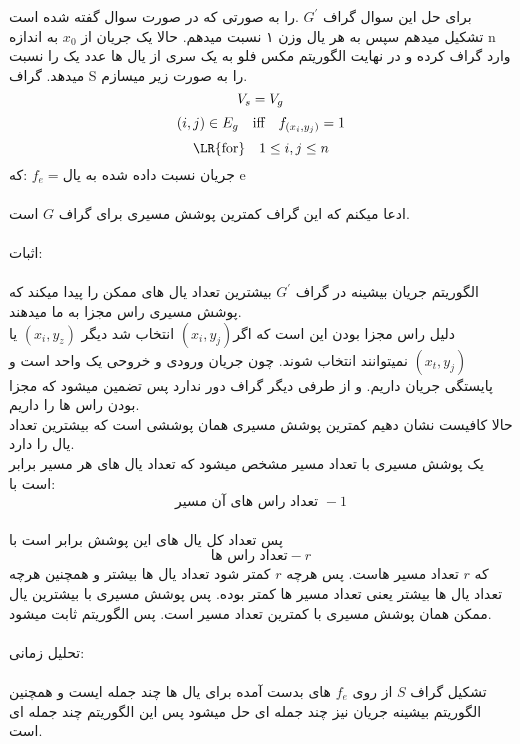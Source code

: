 \problem{}
برای حل این سوال گراف $G^{\prime}$
.را به صورتی که در صورت سوال گفته شده است تشکیل میدهم
سپس به هر یال وزن ۱ نسبت میدهم.
حالا یک جریان از $x_0$
به اندازه n
وارد گراف کرده و در نهایت الگوریتم مکس فلو به یک سری از یال ها عدد یک را نسبت
میدهد.
گراف S را به صورت زیر میسازم.\\
\[
    V_s = V_g\\
\]
\[
    (i,j) \in E_g \quad \text{iff} \quad f_{(x_i,y_j)} = 1\\
\]
\[
    \text{\LR{for}} \quad  1\leq i,j\leq n
\]
که:  $f_e = \text{جریان نسبت داده شده به یال e}$ \\\\
ادعا میکنم که این گراف کمترین پوشش مسیری برای گراف $G$ است.\\\\
اثبات:\\\\
الگوریتم جریان بیشینه در گراف $G^{\prime}$ 
بیشترین تعداد یال های ممکن را پیدا میکند که پوشش مسیری راس مجزا به ما میدهند.\\
دلیل راس مجزا بودن این است که اگر$(x_i,y_j)$ انتخاب شد
دیگر $(x_i,y_z)$ یا $(x_t,y_j)$ نمیتوانند انتخاب شوند.
چون جریان ورودی و خروحی یک واحد است و پایستگی جریان داریم.
و از طرفی دیگر گراف دور ندارد پس تضمین میشود که مجزا بودن راس ها را داریم.\\
حالا کافیست نشان دهیم
کمترین پوشش مسیری همان پوششی است که بیشترین تعداد یال را دارد.
\\
یک پوشش مسیری با تعداد مسیر مشخص میشود که تعداد یال های هر مسیر
برابر است با:\\
\[\text{تعداد راس های آن مسیر } -1\]
\\
پس تعداد کل یال های این پوشش برابر است با 
\[ \text{تعداد راس ها} - r\]
که $r$ تعداد مسیر هاست.
پس هرچه $r$ کمتر شود تعداد یال ها بیشتر و همچنین
هرچه تعداد یال ها بیشتر یعنی تعداد مسیر ها کمتر بوده.
پس پوشش مسیری با بیشترین یال ممکن همان پوشش مسیری با کمترین تعداد مسیر است.
پس الگوریتم ثابت میشود.
\\\\
تحلیل زمانی:\\\\
تشکیل گراف $S$ از روی $f_e$
های بدست آمده برای یال ها چند جمله ایست و همچنین الگوریتم بیشینه جریان نیز
چند جمله ای حل میشود پس
این الگوریتم چند جمله ای است.